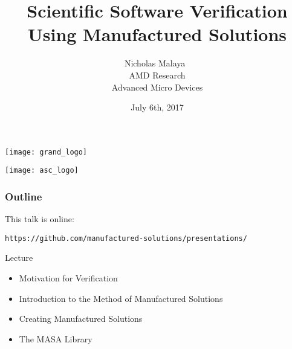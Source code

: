 \documentclass[mathserif]{beamer}
\date{July 6th, 2017}
\author[Nicholas Malaya]{Nicholas Malaya
$~$ \\
{\small
AMD Research \\
Advanced Micro Devices}
}
\title[Software Verification]{Scientific Software Verification\\
Using Manufactured Solutions}
\begin{document}
\renewcommand{\inserttotalframenumber}{50}

\begin{frame}
  \begin{center}
    \texttt{[image: grand\_logo]}\\
  \end{center}
  \titlepage
  \begin{flushright}
    \texttt{[image: asc\_logo]}\\
  \end{flushright}
\end{frame}

\begin{frame}[fragile]
  \frametitle{Outline}

  This talk is online:
\begin{verbatim}https://github.com/manufactured-solutions/presentations/\end{verbatim}
  
  \begin{block}{Lecture}
    \begin{itemize}
    \item Motivation for Verification
    \item Introduction to the Method of Manufactured Solutions
    \item Creating Manufactured Solutions
    \item The MASA Library
    \end{itemize}
  \end{block}


\end{frame}
\end{document}
